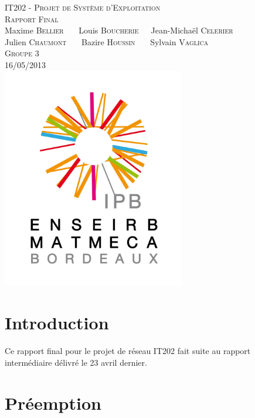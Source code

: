 \documentclass[a4paper,11pt]{article}
\begin{document}
\begin{titlepage}
  \begin{center}

    \textsc{IT202 - Projet de Système d'Exploitation}\\[2cm]
    \textsc{\large Rapport Final}\\[3cm]
    Maxime \textsc{Bellier} \ \ \ Louis \textsc{Boucherie}\ \ \ Jean-Michaël \textsc{Celerier}\\
    Julien \textsc{Chaumont} \ \ \ Bazire \textsc{Houssin} \ \ \ Sylvain \textsc{Vaglica}\\[1cm]
    \textsc{Groupe 3}\\[1.5cm]
    \textsc{\large 16/05/2013 }\\[1.5cm]
    \includegraphics[width=8cm]{logo.png}

  \end{center}
  \vspace{3cm}

\end{titlepage}

\clearpage

\section*{Introduction}

Ce rapport final pour le projet de réseau IT202 fait suite au rapport intermédiaire délivré le 23 avril dernier.

\section{Préemption}
\end{document}
